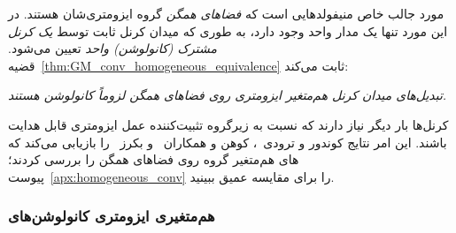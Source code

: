 مورد جالب خاص
منیفولدهایی است که \emph{فضاهای همگن} گروه ایزومتری‌شان هستند.
در این مورد تنها یک مدار واحد وجود دارد، به طوری که میدان کرنل ثابت توسط \emph{یک کرنل مشترک (کانولوشن) واحد} تعیین می‌شود.
قضیه~\ref{thm:GM_conv_homogeneous_equivalence} ثابت می‌کند:
\begin{center}\it
	تبدیل‌های میدان کرنل هم‌متغیر ایزومتری روی فضاهای همگن لزوماً کانولوشن هستند.
\end{center}
کرنل‌ها بار دیگر نیاز دارند که نسبت به زیرگروه تثبیت‌کننده عمل ایزومتری قابل هدایت باشند.
این امر نتایج کوندور و ترودی~\cite{Kondor2018-GENERAL}، کوهن و همکاران~\cite{Cohen2019-generaltheory} و بکرز~\cite{bekkers2020bspline} را بازیابی می‌کند که های هم‌متغیر گروه روی فضاهای همگن را بررسی کردند؛ پیوست~\ref{apx:homogeneous_conv} را برای مقایسه عمیق ببینید.


\subsubsection{هم‌متغیری ایزومتری کانولوشن‌های }
\label{sec:visual_intro_isom_equiv_conv}

